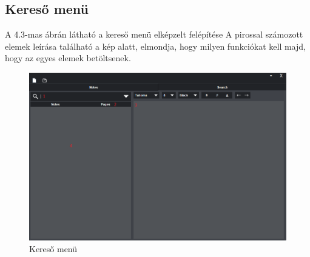 \subsection{Kereső menü}

A 4.3-mas ábrán látható a kereső menü elképzelt felépítése A pirossal számozott elemek leírása található a kép alatt, elmondja, hogy milyen funkciókat kell majd, hogy az egyes elemek betöltsenek.

\begin{figure}[h]
	\centering
	\includegraphics[scale=0.5]{images/menu_3.png}
	\caption{Kereső menü}
	\label{fig:menu_search}
\end{figure}

